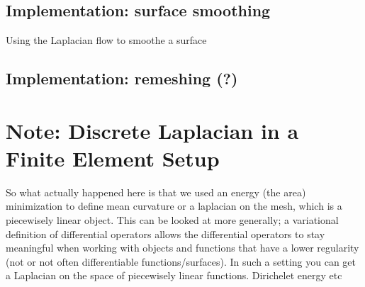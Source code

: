 \subsection{Implementation: surface smoothing}
Using the Laplacian flow to smoothe a surface

\subsection{Implementation: remeshing (?)}

\section{Note: Discrete Laplacian in a Finite Element Setup}
So what actually happened here is that we used an energy (the area) minimization to define mean curvature or a laplacian on the mesh, which is a piecewisely linear object. This can be looked at more generally; a variational definition of differential operators allows the differential operators to stay meaningful when working with objects and functions that have a lower regularity (not or not often differentiable functions/surfaces). In such a setting you can get a Laplacian on the space of piecewisely linear functions. Dirichelet energy etc